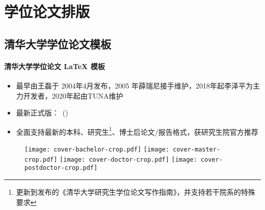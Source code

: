 
\section{学位论文排版}
\subsection{\ThuThesis 清华大学学位论文模板}

\begin{frame}{\ThuThesis}
  \framesubtitle{清华大学学位论文 \LaTeX{} 模板}
  \begin{itemize}
  \item 最早由王磊于 2004年4月发布，2005 年薛瑞尼接手维护，2018年起李泽平为主力开发者，2020年起由TUNA维护
  \item 最新正式版：\ThuThesisVersion\ (\ThuThesisDate)
  \item 全面支持最新的本科、研究生\footnote{更新到\ThuThesisGuideVersion{}发布的《清华大学研究生学位论文写作指南》，并支持若干院系的特殊要求}、博士后论文/报告格式，获研究生院官方推荐 
  \end{itemize}
  \begin{figure}[htbp]
    \centering
    \texttt{[image: cover-bachelor-crop.pdf]}\hfill
    \texttt{[image: cover-master-crop.pdf]}\hfill
    \texttt{[image: cover-doctor-crop.pdf]}\hfill
    \texttt{[image: cover-postdoctor-crop.pdf]}
  \end{figure}
\end{frame}

